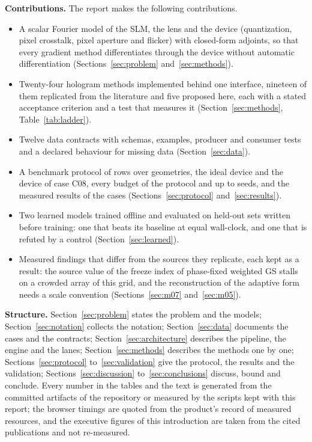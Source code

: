 \textbf{Contributions.} The report makes the following contributions.
\begin{itemize}
\item A scalar Fourier model of the SLM, the lens and the device (quantization, pixel crosstalk, pixel aperture and flicker) with closed-form adjoints, so that every gradient method differentiates through the device without automatic differentiation (Sections~\ref{sec:problem} and~\ref{sec:methods}).
\item Twenty-four hologram methods implemented behind one interface, nineteen of them replicated from the literature and five proposed here, each with a stated acceptance criterion and a test that measures it (Section~\ref{sec:methods}, Table~\ref{tab:ladder}).
\item Twelve data contracts with schemas, examples, producer and consumer tests and a declared behaviour for missing data (Section~\ref{sec:data}).
\item A benchmark protocol of \benchRows{} rows over \benchGeometries{} geometries, the ideal device and the device of case C08, every budget of the protocol and up to \benchSeeds{} seeds, and the measured results of the \nCases{} cases (Sections~\ref{sec:protocol} and~\ref{sec:results}).
\item Two learned models trained offline and evaluated on held-out sets written before training: one that beats its baseline at equal wall-clock, and one that is refuted by a control (Section~\ref{sec:learned}).
\item Measured findings that differ from the sources they replicate, each kept as a result: the source value of the freeze index of phase-fixed weighted GS stalls on a crowded array of this grid, and the reconstruction of the adaptive form needs a scale convention (Sections~\ref{sec:m07} and~\ref{sec:m05}).
\end{itemize}

\textbf{Structure.} Section~\ref{sec:problem} states the problem and the models; Section~\ref{sec:notation} collects the notation; Section~\ref{sec:data} documents the cases and the contracts; Section~\ref{sec:architecture} describes the pipeline, the engine and the lanes; Section~\ref{sec:methods} describes the methods one by one; Sections~\ref{sec:protocol} to~\ref{sec:validation} give the protocol, the results and the validation; Sections~\ref{sec:discussion} to~\ref{sec:conclusions} discuss, bound and conclude. Every number in the tables and the text is generated from the committed artifacts of the repository or measured by the scripts kept with this report; the browser timings are quoted from the product's record of measured resources, and the executive figures of this introduction are taken from the cited publications and not re-measured.

